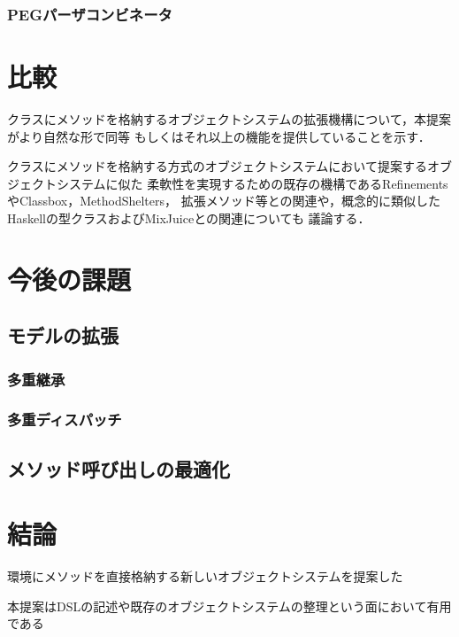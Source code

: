 \documentclass{ipsjprosym}
\begin{document}
\subsubsection{PEGパーザコンビネータ}

\section{比較}

クラスにメソッドを格納するオブジェクトシステムの拡張機構について，本提案がより自然な形で同等
もしくはそれ以上の機能を提供していることを示す．

クラスにメソッドを格納する方式のオブジェクトシステムにおいて提案するオブジェクトシステムに似た
柔軟性を実現するための既存の機構であるRefinementsやClassbox，MethodShelters，
拡張メソッド等との関連や，概念的に類似したHaskellの型クラスおよびMixJuiceとの関連についても
議論する．

\section{今後の課題}

\subsection{モデルの拡張}

\subsubsection{多重継承}

\subsubsection{多重ディスパッチ}

\subsection{メソッド呼び出しの最適化}

\section{結論}

環境にメソッドを直接格納する新しいオブジェクトシステムを提案した

本提案はDSLの記述や既存のオブジェクトシステムの整理という面において有用である





\end{document}
